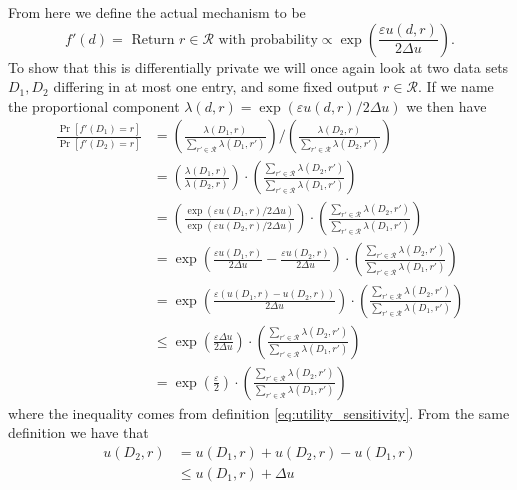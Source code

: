 \documentclass[12pt]{article}
\newcommand{\fancy}{\mathcal}
\renewcommand{\epsilon}{\varepsilon}
\begin{document}
From here we define the actual mechanism to be
\begin{equation*}
    f'(d) = \text{ Return } r \in \fancy{R} \text{ with probability} \propto \exp\left( \frac{\epsilon u(d,r)}{2\Delta u} \right).
\end{equation*}
To show that this is differentially private we will once again look at two data sets $D_1,D_2$ differing in at most one entry, and some fixed output $r \in \fancy{R}$. If we name the proportional component $\lambda(d,r) = \exp \left( \epsilon u(d,r) / 2 \Delta u \right)$ we then have
\begin{align}
    \frac{\Pr[f'(D_1) = r]}{\Pr[f'(D_2) = r]} &= 
                \left( \frac{\lambda(D_1,r)}{\sum_{r' \in \fancy{R}} \lambda(D_1,r')} \right)
                /
                \left( \frac{\lambda(D_2,r)}{\sum_{r' \in \fancy{R}} \lambda(D_2,r')} \right) \nonumber\\
            &= \left( \frac{\lambda(D_1,r)}{\lambda(D_2,r)} \right) \cdot \left( \frac{\sum_{r'\in\fancy{R}} \lambda(D_2,r')}{\sum_{r'\in\fancy{R}} \lambda(D_1,r')} \right) \nonumber\\
            &= \left( \frac{\exp(\epsilon u(D_1,r)/2\Delta u)}{\exp(\epsilon u(D_2,r)/2\Delta u)} \right) \cdot \left( \frac{\sum_{r'\in\fancy{R}} \lambda(D_2,r')}{\sum_{r'\in\fancy{R}} \lambda(D_1,r')} \right) \nonumber\\
            &= \exp \left( \frac{\epsilon u(D_1,r)}{2\Delta u} - \frac{\epsilon u(D_2,r)}{2\Delta u} \right) \cdot \left( \frac{\sum_{r'\in\fancy{R}} \lambda(D_2,r')}{\sum_{r'\in\fancy{R}} \lambda(D_1,r')} \right) \nonumber\\
            &= \exp \left( \frac{\epsilon (u(D_1,r) - u(D_2,r))}{2\Delta u}\right) \cdot \left( \frac{\sum_{r'\in\fancy{R}} \lambda(D_2,r')}{\sum_{r'\in\fancy{R}} \lambda(D_1,r')} \right) \nonumber\\
            &\leq \exp \left( \frac{\epsilon \Delta u}{2\Delta u}\right) \cdot \left( \frac{\sum_{r'\in\fancy{R}} \lambda(D_2,r')}{\sum_{r'\in\fancy{R}} \lambda(D_1,r')} \right) \nonumber\\
            &= \exp \left( \frac{\epsilon}{2} \right) \cdot \left( \frac{\sum_{r'\in\fancy{R}} \lambda(D_2,r')}{\sum_{r'\in\fancy{R}} \lambda(D_1,r')} \right) \label{eq:expmech}
\end{align}
where the inequality comes from definition \ref{eq:utility_sensitivity}. From the same definition we have that
\begin{align*}
    u(D_2,r) &= u(D_1,r) + u(D_2,r) - u(D_1,r) \\
        &\leq u(D_1,r) + \Delta u
\end{align*}
\end{document}

